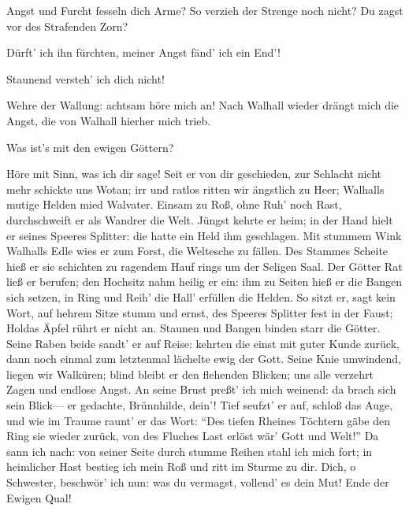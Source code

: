 \begin{drama}


\Brunnhildespeaks

Angst und Furcht fesseln dich Arme?
So verzieh der Strenge noch nicht?
Du zagst vor des Strafenden Zorn?
 

\Waltrautespeaks



Dürft' ich ihn fürchten,
meiner Angst fänd' ich ein End'!
 

\Brunnhildespeaks

Staunend versteh' ich dich nicht!
 

\Waltrautespeaks

Wehre der Wallung:
achtsam höre mich an!
Nach Walhall wieder
drängt mich die Angst,
die von Walhall hierher mich trieb.
 

\Brunnhildespeaks



Was ist's mit den ewigen Göttern?
 

\Waltrautespeaks

Höre mit Sinn, was ich dir sage!
Seit er von dir geschieden,
zur Schlacht nicht mehr schickte uns Wotan;
irr und ratlos ritten wir ängstlich zu Heer;
Walhalls mutige Helden mied Walvater.
Einsam zu Roß, ohne Ruh' noch Rast,
durchschweift er als Wandrer die Welt.
Jüngst kehrte er heim;
in der Hand hielt er seines Speeres Splitter:
die hatte ein Held ihm geschlagen.
Mit stummem Wink Walhalls Edle
wies er zum Forst, die Weltesche zu fällen.
Des Stammes Scheite hieß er sie schichten
zu ragendem Hauf rings um der Seligen Saal.
Der Götter Rat ließ er berufen;
den Hochsitz nahm heilig er ein:
ihm zu Seiten hieß er die Bangen sich setzen,
in Ring und Reih' die Hall' erfüllen die Helden.
So sitzt er, sagt kein Wort,
auf hehrem Sitze stumm und ernst,
des Speeres Splitter fest in der Faust;
Holdas Äpfel rührt er nicht an.
Staunen und Bangen binden starr die Götter.
Seine Raben beide sandt' er auf Reise:
kehrten die einst mit guter Kunde zurück,
dann noch einmal zum letztenmal
lächelte ewig der Gott.
Seine Knie umwindend, liegen wir Walküren;
blind bleibt er den flehenden Blicken;
uns alle verzehrt Zagen und endlose Angst.
An seine Brust preßt' ich mich weinend:
da brach sich sein Blick---
er gedachte, Brünnhilde, dein'!
Tief seufzt' er auf, schloß das Auge,
und wie im Traume
raunt' er das Wort:
``Des tiefen Rheines Töchtern
gäbe den Ring sie wieder zurück,
von des Fluches Last
erlöst wär' Gott und Welt!''
Da sann ich nach: von seiner Seite
durch stumme Reihen stahl ich mich fort;
in heimlicher Hast bestieg ich mein Roß
und ritt im Sturme zu dir.
Dich, o Schwester, beschwör' ich nun:
was du vermagst, vollend' es dein Mut!
Ende der Ewigen Qual!
 



\end{drama}
